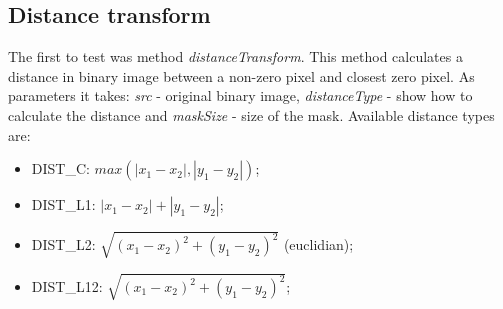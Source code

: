 \documentclass{article}
\begin{document}
\subsection{Distance transform}

The first to test was method \textit{distanceTransform}. This method calculates a distance in binary image between a non-zero pixel and closest zero pixel. As parameters it takes: \textit{src} - original binary image, \textit{distanceType} - show how to calculate the distance and \textit{maskSize} - size of the mask. Available distance types are:

\begin{itemize}
\item DIST_C: $max\left(|x_1 - x_2|, |y_1 - y_2|\right)$;
\item DIST_L1: $|x_1 - x_2| + |y_1 - y_2|$;
\item DIST_L2: $\sqrt{\left(x_1 - x_2\right)^2 + \left(y_1 - y_2\right)^2}$ (euclidian);
\item DIST_L12: $\sqrt{\left(x_1 - x_2\right)^2 + \left(y_1 - y_2\right)^2}$;
\end{itemize} 

\sec
\end{document}
